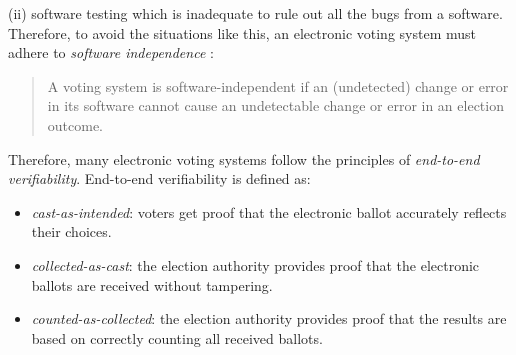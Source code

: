 \documentclass[sigconf, anonymous]{acmart}
\begin{document}
(ii) software testing which is inadequate to rule out all the bugs 
from a software. Therefore, to avoid the situations like this, 
an electronic voting system must adhere to \textit{software independence} \cite{rivest2008notion}:
\begin{quote}
  A voting system is software-independent if an
  (undetected) change or error in its software cannot
  cause an undetectable change or error in an
  election outcome. 
\end{quote}
\noindent
Therefore, many electronic voting systems follow the principles 
of \textit{end-to-end verifiability}. End-to-end verifiability is 
defined as: 
\begin{itemize}
  \item \textit{cast-as-intended}: voters get proof that the electronic ballot accurately reflects their choices.
  \item \textit{collected-as-cast}: the election authority provides proof that the electronic ballots are received without tampering.
  \item \textit{counted-as-collected}: the election authority provides proof that the results are based on correctly counting all received ballots.
\end{itemize} 
\end{document}

